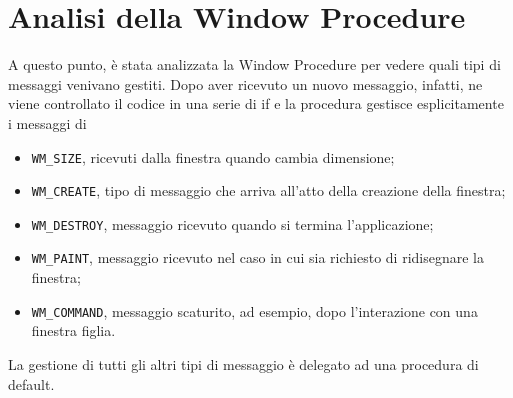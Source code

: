 \documentclass[12pt]{extarticle}
\begin{document}
\section{Analisi della Window Procedure}
A questo punto, è stata analizzata la Window Procedure per vedere quali tipi di messaggi venivano gestiti. Dopo aver ricevuto un nuovo messaggio, infatti, ne viene controllato il codice in una serie di if e la procedura gestisce esplicitamente i messaggi di
\begin{itemize}
\item \texttt{WM\_SIZE}, ricevuti dalla finestra quando cambia dimensione;
\item \texttt{WM\_CREATE}, tipo di messaggio che arriva all'atto della creazione della finestra;
\item \texttt{WM\_DESTROY}, messaggio ricevuto quando si termina l'applicazione;
\item \texttt{WM\_PAINT}, messaggio ricevuto nel caso in cui sia richiesto di ridisegnare la finestra;
\item \texttt{WM\_COMMAND}, messaggio scaturito, ad esempio, dopo l'interazione con una finestra figlia.
\end{itemize}
La gestione di tutti gli altri tipi di messaggio è delegato ad una procedura di default.
\end{document}
